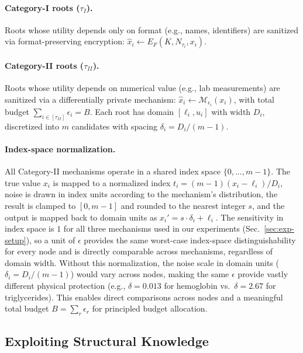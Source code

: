 \paragraph{Category-I roots ($\tau_I$).} Roots whose utility depends only on format (e.g., names, identifiers) are sanitized via format-preserving encryption: $\hat{x}_i \gets E_F(K, N_{\tau_i}, x_i)$.
 
\paragraph{Category-II roots ($\tau_{II}$).} Roots whose utility depends on numerical value (e.g., lab measurements) are sanitized via a differentially private mechanism: $\hat{x}_i \gets \mathcal{M}_{\epsilon_i}(x_i)$, with total budget $\sum_{i \in [\tau_{II}]} \epsilon_i = B$. Each root has domain $[\ell_i, u_i]$ with width $D_i$, discretized into $m$ candidates with spacing $\delta_i = D_i/(m{-}1)$.
 
\paragraph{Index-space normalization.}
All Category-II mechanisms operate in a shared index space $\{0, \ldots, m{-}1\}$. The true value $x_i$ is mapped to a normalized index $t_i = (m-1)(x_i - \ell_i)/D_i$, noise is drawn in index units according to the mechanism's distribution, the result is clamped to $[0, m{-}1]$ and rounded to the nearest integer $s$, and the output is mapped back to domain units as $x_i' = s \cdot \delta_i + \ell_i$. The sensitivity in index space is $1$ for all three mechanisms used in our experiments (Sec.~\ref{sec:exp-setup}), so a unit of $\epsilon$ provides the same worst-case index-space distinguishability for every node and is directly comparable across mechanisms, regardless of domain width. Without this normalization, the noise scale in domain units ($\delta_i = D_i/(m-1)$) would vary across nodes, making the same $\epsilon$ provide vastly different physical protection (e.g., $\delta = 0.013$ for hemoglobin vs.\ $\delta = 2.67$ for triglycerides). This enables direct comparisons across nodes and a meaningful total budget $B = \sum_r \epsilon_r$ for principled budget allocation.


\subsection{Exploiting Structural Knowledge}
\label{sec:exploiting-dependencies}
 
